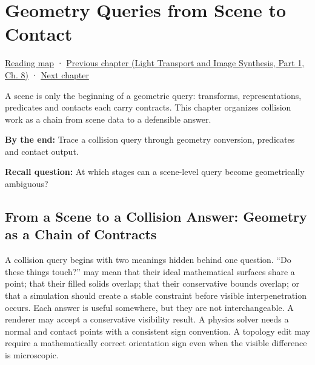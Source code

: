 \chapter{Geometry Queries from Scene to Contact}\label{03-visual-computing-i-ch020-geometry-queries-from-scene-to-contact}\hypertarget{03-visual-computing-i-ch020}{}\label{stagechapter:03-visual-computing-i-ch020}

\hypertarget{03-visual-computing-i-ch020-geometry-queries-from-scene-to-contact}{}

\hyperref[volume-reading-map]{Reading map} · \href{../04-Light-Transport-and-Image-Synthesis-P01/main.pdf\#nameddest=03-visual-computing-i-ch019-textures-as-sampled-surface-signals}{Previous chapter (Light Transport and Image Synthesis, Part 1, Ch. 8)} · \hyperref[03-visual-computing-i-ch021-collision-implementations-and-repository-comparison]{Next chapter}

A scene is only the beginning of a geometric query: transforms, representations, predicates and contacts each carry contracts. This chapter organizes collision work as a chain from scene data to a defensible answer.

\textbf{By the end:} Trace a collision query through geometry conversion, predicates and contact output.

\textbf{Recall question:} At which stages can a scene-level query become geometrically ambiguous?

\section{From a Scene to a Collision Answer: Geometry as a Chain of Contracts}\label{03-visual-computing-i-ch020-from-a-scene-to-a-collision-answer-geometry-as-a-chain-of-contracts}

\hypertarget{03-visual-computing-i-ch020-from-a-scene-to-a-collision-answer-geometry-as-a-chain-of-contracts}{}

A collision query begins with two meanings hidden behind one question. ``Do these things touch?'' may mean that their ideal mathematical surfaces share a point; that their filled solids overlap; that their conservative bounds overlap; or that a simulation should create a stable constraint before visible interpenetration occurs. Each answer is useful somewhere, but they are not interchangeable. A renderer may accept a conservative visibility result. A physics solver needs a normal and contact points with a consistent sign convention. A topology edit may require a mathematically correct orientation sign even when the visible difference is microscopic.

